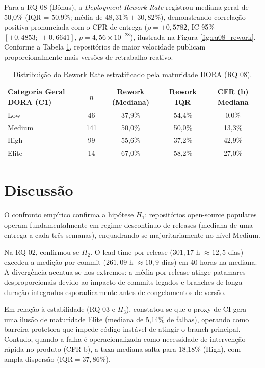 \documentclass[12pt]{article}
\begin{document}
Para a RQ 08 (Bônus), a \textit{Deployment Rework Rate} registrou mediana geral de 50,0\% (IQR = 50,9\%; média de $48{,}31\% \pm 30{,}82\%$), demonstrando correlação positiva pronunciada com o CFR de entrega ($\rho = +0{,}5782$, IC 95\% $[+0{,}4853;\ +0{,}6641]$, $p = 4{,}56 \times 10^{-28}$), ilustrada na Figura \ref{fig:rq08_rework}. Conforme a Tabela \ref{tab:rework}, repositórios de maior velocidade publicam proporcionalmente mais versões de retrabalho reativo.

\begin{table}[htbp]
\centering
\caption{Distribuição do Rework Rate estratificado pela maturidade DORA (RQ 08).}
\label{tab:rework}
\footnotesize
\setlength{\tabcolsep}{4pt}
\begin{tabular}{lcccc}
\toprule
Categoria Geral DORA (C1) & $n$ & Rework (Mediana) & Rework IQR & CFR (b) Mediana \\
\midrule
Low & 46 & 37,9\% & 54,4\% & 0,0\% \\
Medium & 141 & 50,0\% & 50,0\% & 13,3\% \\
High & 99 & 55,6\% & 37,2\% & 42,9\% \\
Elite & 14 & 67,0\% & 58,2\% & 27,0\% \\
\bottomrule
\end{tabular}
\end{table}

\section{Discussão}
\label{sec:discussao}

O confronto empírico confirma a hipótese $H_1$: repositórios open-source populares operam fundamentalmente em regime descontínuo de releases (mediana de uma entrega a cada três semanas), enquadrando-se majoritariamente no nível Medium.

Na RQ 02, confirmou-se $H_2$. O lead time por release ($301{,}17$ h $\approx 12{,}5$ dias) excedeu a medição por commit ($261{,}09$ h $\approx 10{,}9$ dias) em 40 horas na mediana. A divergência acentua-se nos extremos: a média por release atinge patamares desproporcionais devido ao impacto de commits legados e branches de longa duração integrados esporadicamente antes de congelamentos de versão.

Em relação à estabilidade (RQ 03 e $H_3$), constatou-se que o proxy de CI gera uma ilusão de maturidade Elite (mediana de 5,14\% de falhas), operando como barreira protetora que impede código instável de atingir o branch principal. Contudo, quando a falha é operacionalizada como necessidade de intervenção rápida no produto (CFR b), a taxa mediana salta para 18,18\% (High), com ampla dispersão ($\text{IQR} = 37{,}86\%$).
\end{document}
